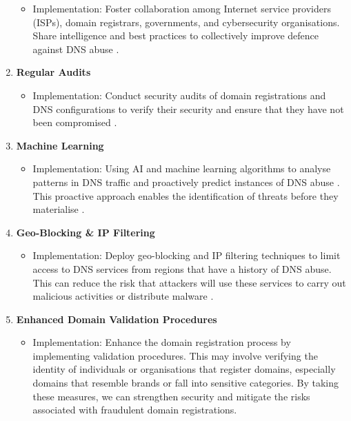\begin{enumerate}
\begin{itemize}
        \item Implementation: Foster collaboration among Internet service providers (ISPs), domain registrars, governments, and cybersecurity organisations. Share intelligence and best practices to collectively improve defence against DNS abuse \cite{skopik2017collaborative}.
    \end{itemize}
    \item \textbf{Regular Audits}
    \begin{itemize}
        \item Implementation: Conduct security audits of domain registrations and DNS configurations to verify their security and ensure that they have not been compromised \cite{coronado2014auditing}.
    \end{itemize}
    \item \textbf{Machine Learning}
    \begin{itemize}
        \item Implementation: Using AI and machine learning algorithms to analyse patterns in DNS traffic and proactively predict instances of DNS abuse \cite{icannndnssec}. This proactive approach enables the identification of threats before they materialise \cite{tsukerman2019machine}.
    \end{itemize}
    \item \textbf{Geo-Blocking \& IP Filtering}
    \begin{itemize}
        \item Implementation: Deploy geo-blocking and IP filtering techniques to limit access to DNS services from regions that have a history of DNS abuse. This can reduce the risk that attackers will use these services to carry out malicious activities or distribute malware \cite{meeseedited}.
    \end{itemize}
    \vspace{25px}
    \item \textbf{Enhanced Domain Validation Procedures}
    \begin{itemize}
        \item Implementation: Enhance the domain registration process by implementing validation procedures. This may involve verifying the identity of individuals or organisations that register domains, especially domains that resemble brands or fall into sensitive categories. By taking these measures, we can strengthen security and mitigate the risks associated with fraudulent domain registrations.
    \end{itemize}
\end{enumerate}


